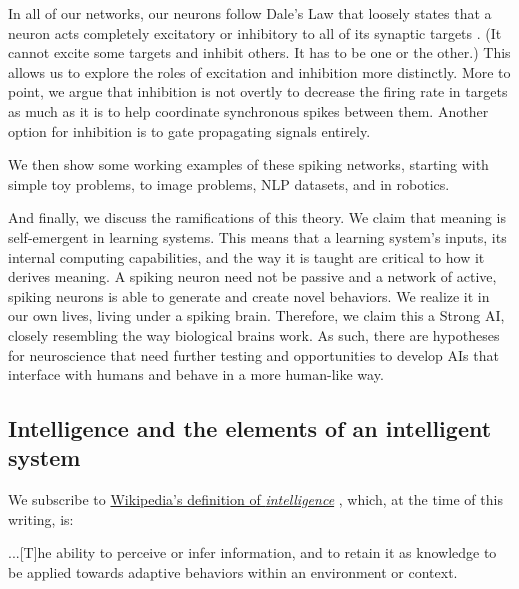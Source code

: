 In all of our networks, our neurons follow Dale's Law that loosely states that a neuron acts completely excitatory or inhibitory to all of its synaptic targets \cite{dalePharmacologyNerveEndings1935}.
(It cannot excite some targets and inhibit others. It has to be one or the other.)
This allows us to explore the roles of excitation and inhibition more distinctly.
More to point, we argue that inhibition is not overtly to decrease the firing rate in targets as much as it is to help coordinate synchronous spikes between them. 
Another option for inhibition is to gate propagating signals entirely.

We then show some working examples of these spiking networks, starting with simple toy problems, to image problems, NLP datasets, and in robotics.

And finally, we discuss the ramifications of this theory.
We claim that meaning is self-emergent in learning systems.
This means that a learning system's inputs, its internal computing capabilities, and the way it is taught are critical to how it derives meaning.
A spiking neuron need not be passive and a network of active, spiking neurons is able to generate and create novel behaviors.
We realize it in our own lives, living under a spiking brain.
Therefore, we claim this a Strong AI, closely resembling the way biological brains work.
As such, there are hypotheses for neuroscience that need further testing and opportunities to develop AIs that interface with humans and behave in a more human-like way.

\subsection{Intelligence and the elements of an intelligent system}

We subscribe to \href{https://en.wikipedia.org/wiki/Intelligence}{Wikipedia's definition of \emph{intelligence}} \cite{wikipediacontributorsIntelligenceWikipediaFree2021}, which, at the time of this writing, is:
\begin{displayquote}
...[T]he ability to perceive or infer information, and to retain it as knowledge to be applied towards adaptive behaviors within an environment or context.
\end{displayquote}

